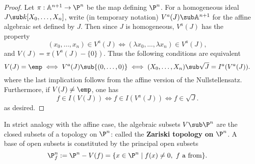 \begin{proof}
Let $\pi:\mathbb{A}^{n+1}\to\P^n$ be the map defining $\P^n$. For a homogeneous ideal $J\sub k[X_0,\dots,X_n]$, write (in temporary notation) $V^a(J)\sub\mathbb{A}^{n+1}$ for the affine algebraic set defined by $J$. Then since $J$ is homogeneous, $V^a(J)$ has the property
\[(x_0,\dots,x_n)\in  V^a(J)\iff (\lambda x_0,\dots,\lambda x_{n})\in V^a(J),\]
and $V(J)=\pi(V^a(J)-\{0\})$. Thus the following conditions are equivalent
\[V(J)=\emp\iff V^a(J)\sub\{(0,\dots,0)\}\iff(X_0,\dots,X_n)\sub\sqrt{J}=I^a(V^a(J)).\]
where the last implication follows from the affine version of the Nullstellensatz. Furthermore, if $V(J)\neq\emp$, one has
\[f\in I(V(J))\iff f\in I(V^a(J))\iff f\in\sqrt{J}.\]
as desired.
\end{proof}
In strict analogy with the affine case, the algebraic subsets $V\sub\P^n$ are the closed subsets of a topology on $\P^n$: called the \textbf{Zariski topology on $\P^n$}. A base of open subsets is constituted by the principal open subsets
\[\P^n_f:=\P^n-V(f)=\{x\in\P^n\mid f(x)\neq 0,\text{ $f$ a from}\}.\]
